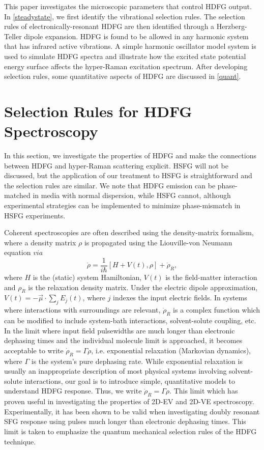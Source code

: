 \documentclass[aip, jcp, reprint, onecolumn, nofootinbib]{revtex4-2}
\begin{document}
This paper investigates the microscopic parameters that control HDFG output. \cite{Bonn2024, McDonnell2024}
In \autoref{steadystate}, we first identify the vibrational selection rules. 
The selection rules of electronically-resonant HDFG are then identified through a Herzberg-Teller dipole expansion.
HDFG is found to be allowed in any harmonic system that has infrared active vibrations.
A simple harmonic oscillator model system is used to simulate HDFG spectra and illustrate how the excited state potential energy surface affects the hyper-Raman excitation spectrum.
After developing selection rules, some quantitative aspects of HDFG are discussed in \autoref{quant}.

\section{Selection Rules for HDFG Spectroscopy}\label{steadystate}

In this section, we investigate the properties of HDFG and make the connections between HDFG and hyper-Raman scattering explicit.
HSFG will not be discussed, but the application of our treatment to HSFG is straightforward and the selection rules are similar.
We note that HDFG emission can be phase-matched in media with normal dispersion, while HSFG cannot,\cite{RN278} although experimental strategies can be implemented to minimize phase-mismatch in HSFG experiments. \cite{Kaufman2024}  

Coherent spectroscopies are often described using the density-matrix formalism, where a density matrix $\rho$ is propagated using the Liouville-von Neumann equation $via$
\begin{equation}
	\dot{\rho} = \frac{1}{i \hbar} [H + V(t), \rho] + \dot{\rho}_R,
\end{equation}
where $H$ is the (static) system Hamiltonian, $V(t)$ is the field-matter interaction and $\rho_R$ is the relaxation density matrix. 
Under the electric dipole approximation, $V(t) = -\vec{\mu} \cdot \sum_{j} E_j(t)$, where $j$ indexes the input electric fields.
In systems where interactions with surroundings are relevant, $\dot{\rho}_R$ is a complex function which can be modified to include system-bath interactions, solvent-solute coupling, etc. \cite{Sung2001}
In the limit where input field pulsewidths are much longer than electronic dephasing times and the individual molecule limit is approached, it becomes acceptable to write $\dot{\rho}_R = \Gamma \rho$, i.e. exponential relaxation (Markovian dynamics), where $\Gamma$ is the system's pure dephasing rate. \cite{RN455, RN307, Sung2001}
While exponential relaxation is usually an inappropriate description of most physical systems involving solvent-solute interactions,\cite{Sue1986, Yan1988, Li1994, Myers1997} our goal is to introduce simple, quantitative models to understand HDFG response.
Thus, we write $\dot{\rho}_R = \Gamma \rho$.
This limit which has proven useful in investigating the properties of 2D-EV and 2D-VE spectroscopy. \cite{Gaynor2017} 
Experimentally, it has been shown to be valid when investigating doubly resonant SFG response using pulses much longer than electronic dephasing times. \cite{Raschke2002}
This limit is taken to emphasize the quantum mechanical selection rules of the HDFG technique. 
\end{document}
